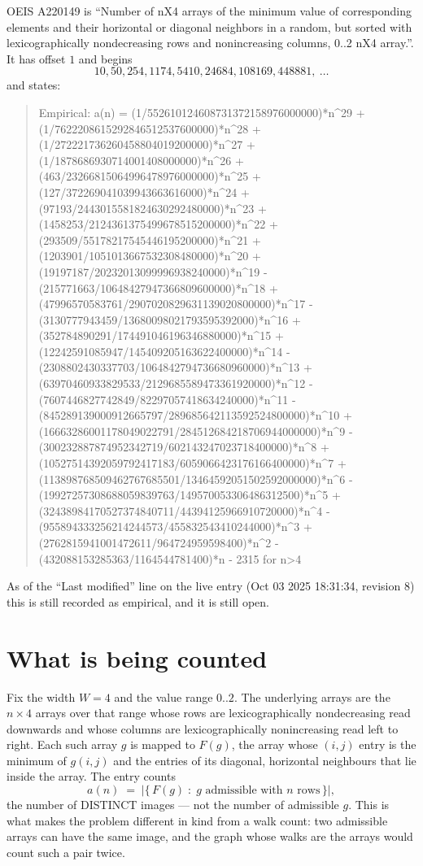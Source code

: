 \documentclass[11pt,a4paper]{article}
\theoremstyle{plain}
\theoremstyle{definition}
\begin{document}
OEIS A220149 is ``Number of nX4 arrays of the minimum value of corresponding elements and their horizontal or diagonal neighbors in a random, but sorted with lexicographically nondecreasing rows and nonincreasing columns, 0..2 nX4 array.''. It has offset $1$ and begins
\[
10, 50, 254, 1174, 5410, 24684, 108169, 448881,\ \dots
\]
and states:
\begin{quote}
Empirical: a(n) = (1/552610124608731372158976000000)*n\^{}29 + (1/7622208615292846512537600000)*n\^{}28 + (1/272221736260458804019200000)*n\^{}27 + (1/1878686930714001408000000)*n\^{}26 + (463/23266815064996478976000000)*n\^{}25 + (127/372269041039943663616000)*n\^{}24 + (97193/2443015581824630292480000)*n\^{}23 + (1458253/2124361375499678515200000)*n\^{}22 + (293509/55178217545446195200000)*n\^{}21 + (1203901/1051013667532308480000)*n\^{}20 + (19197187/20232013099996938240000)*n\^{}19 - (215771663/10648427947366809600000)*n\^{}18 + (47996570583761/2907020829631139020800000)*n\^{}17 - (3130777943459/13680098021793595392000)*n\^{}16 + (352784890291/174491046196346880000)*n\^{}15 + (12242591085947/145409205163622400000)*n\^{}14 - (2308802430337703/1064842794736680960000)*n\^{}13 + (63970460933829533/2129685589473361920000)*n\^{}12 - (7607446827742849/82297057418634240000)*n\^{}11 - (845289139000912665797/289685642113592524800000)*n\^{}10 + (16663286001178049022791/284512684218706944000000)*n\^{}9 - (300232887874952342719/602143247023718400000)*n\^{}8 + (10527514392059792417183/6059066423176166400000)*n\^{}7 + (113898768509462767685501/13464592051502592000000)*n\^{}6 - (19927257308688059839763/149570053306486312500)*n\^{}5 + (32438984170527374840711/44394125966910720000)*n\^{}4 - (955894333256214244573/455832543410244000)*n\^{}3 + (2762815941001472611/964724959598400)*n\^{}2 - (432088153285363/1164544781400)*n - 2315 for n>4
\end{quote}
As of the ``Last modified'' line on the live entry (Oct 03 2025 18:31:34, revision 8)
this is still recorded as empirical, and it is still open.

\section{What is being counted}

Fix the width $W=4$ and the value range $0..2$. The underlying arrays are the
$n\times4$ arrays over that range whose rows are lexicographically nondecreasing read downwards
and whose columns are lexicographically nonincreasing read left to right. Each such array $g$
is mapped to $F(g)$, the array whose $(i,j)$ entry is the minimum of $g(i,j)$ and the entries
of its diagonal, horizontal neighbours that lie inside the array. The entry counts
\[
a(n)\;=\;\bigl|\{\,F(g)\;:\;g\text{ admissible with }n\text{ rows}\,\}\bigr|,
\]
the number of DISTINCT images --- not the number of admissible $g$. This is what makes the
problem different in kind from a walk count: two admissible arrays can have the same image, and
the graph whose walks are the arrays would count such a pair twice.
\end{document}
